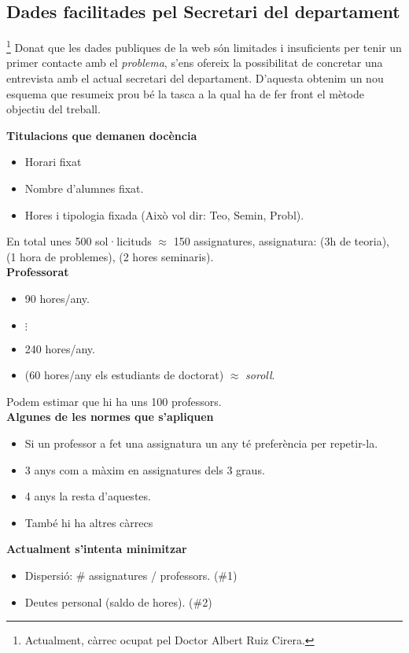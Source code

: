 \documentclass[10pt]{proc}
\begin{document}
\subsection{Dades facilitades pel Secretari del departament}\footnote{Actualment, càrrec ocupat pel Doctor Albert Ruiz Cirera.}
Donat que les dades publiques de la web són limitades i insuficients per tenir un primer contacte amb el \textit{problema}, s'ens ofereix la possibilitat de concretar una entrevista amb el actual secretari del departament. D'aquesta obtenim un nou esquema que resumeix prou bé la tasca a la qual ha de fer front el mètode objectiu del treball.
\vspace{3mm}

\begin{tcolorbox}[colback=black!1,title=\textbf{Dades del funcionament intern del \textit{model actual}},coltitle=black,colbacktitle=black!10]
	\textbf{Titulacions que demanen docència}
	\begin{itemize}
		\item Horari fixat
		\item Nombre d'alumnes fixat.
		\item Hores i tipologia fixada (Això vol dir: Teo, Semin, Probl).
	\end{itemize}
	En total unes 500 sol·licituds $\approx$ 150 assignatures, assignatura: (3h de teoria), (1 hora de problemes), (2 hores seminaris).
	\\
	\textbf{Professorat}
	\begin{itemize}
		\item 90 hores/any.
		\item $\vdots$
		\item 240 hores/any.
		\item (60 hores/any els estudiants de doctorat) $\approx$ \textit{soroll}.
	\end{itemize}
	Podem estimar que hi ha uns 100 professors.\\
	\textbf{Algunes de les normes que s'apliquen}
	\begin{itemize}
		\item Si un professor a fet una assignatura un any  té preferència per repetir-la.
		\item 3 anys com a màxim en assignatures dels 3 graus.
		\item 4 anys la resta d'aquestes.
		\item També hi ha altres càrrecs 
	\end{itemize}
	\textbf{Actualment s'intenta minimitzar}
	\begin{itemize}
		\item Dispersió: \# assignatures / professors. (\#1)
		\item Deutes personal (saldo de hores). (\#2)
	\end{itemize}
	\end{tcolorbox}
\end{document}
